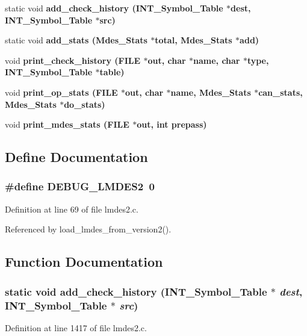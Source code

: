 \begin{CompactItemize}
static void \bf{add\_\-check\_\-history} (\bf{INT\_\-Symbol\_\-Table} $\ast$dest, \bf{INT\_\-Symbol\_\-Table} $\ast$src)
\item 
static void \bf{add\_\-stats} (\bf{Mdes\_\-Stats} $\ast$\bf{total}, \bf{Mdes\_\-Stats} $\ast$add)
\item 
void \bf{print\_\-check\_\-history} (FILE $\ast$out, char $\ast$\bf{name}, char $\ast$type, \bf{INT\_\-Symbol\_\-Table} $\ast$table)
\item 
void \bf{print\_\-op\_\-stats} (FILE $\ast$out, char $\ast$\bf{name}, \bf{Mdes\_\-Stats} $\ast$can\_\-stats, \bf{Mdes\_\-Stats} $\ast$do\_\-stats)
\item 
void \bf{print\_\-mdes\_\-stats} (FILE $\ast$out, int prepass)
\end{CompactItemize}


\subsection{Define Documentation}
\subsubsection{\setlength{\rightskip}{0pt plus 5cm}\#define DEBUG\_\-LMDES2~0}\label{lmdes2_8c_cbd33eb94d61d242d3c1c9077a8cbe3a}




Definition at line 69 of file lmdes2.c.

Referenced by load\_\-lmdes\_\-from\_\-version2().

\subsection{Function Documentation}
\subsubsection{\setlength{\rightskip}{0pt plus 5cm}static void add\_\-check\_\-history (\bf{INT\_\-Symbol\_\-Table} $\ast$ {\em dest}, \bf{INT\_\-Symbol\_\-Table} $\ast$ {\em src})\hspace{0.3cm}{\tt  [static]}}\label{lmdes2_8c_0126b1769b797ae98c87c73835892b8f}




Definition at line 1417 of file lmdes2.c.

